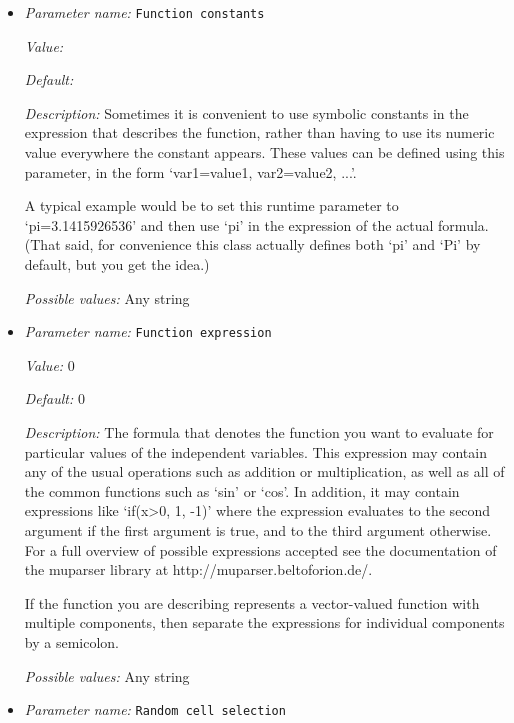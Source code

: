 \begin{itemize}
\item {\it Parameter name:} {\tt Function constants}
\label{parameters:Postprocess/Particles/Generator/Probability density function/Function constants}


{\it Value:} 


{\it Default:} 


{\it Description:} Sometimes it is convenient to use symbolic constants in the expression that describes the function, rather than having to use its numeric value everywhere the constant appears. These values can be defined using this parameter, in the form `var1=value1, var2=value2, ...'.

A typical example would be to set this runtime parameter to `pi=3.1415926536' and then use `pi' in the expression of the actual formula. (That said, for convenience this class actually defines both `pi' and `Pi' by default, but you get the idea.)


{\it Possible values:} Any string
\item {\it Parameter name:} {\tt Function expression}
\label{parameters:Postprocess/Particles/Generator/Probability density function/Function expression}


{\it Value:} 0


{\it Default:} 0


{\it Description:} The formula that denotes the function you want to evaluate for particular values of the independent variables. This expression may contain any of the usual operations such as addition or multiplication, as well as all of the common functions such as `sin' or `cos'. In addition, it may contain expressions like `if(x>0, 1, -1)' where the expression evaluates to the second argument if the first argument is true, and to the third argument otherwise. For a full overview of possible expressions accepted see the documentation of the muparser library at http://muparser.beltoforion.de/.

If the function you are describing represents a vector-valued function with multiple components, then separate the expressions for individual components by a semicolon.


{\it Possible values:} Any string
\item {\it Parameter name:} {\tt Random cell selection}
\label{parameters:Postprocess/Particles/Generator/Probability density function/Random cell selection}



\end{itemize}
